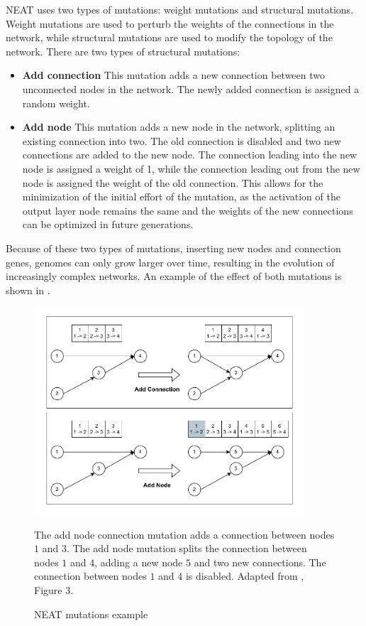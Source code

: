 NEAT uses two types of mutations: weight mutations and structural mutations. Weight mutations are used to perturb the weights of the connections in the network, while
structural mutations are used to modify the topology of the network. There are two types of structural mutations:

\begin{itemize}
    \item \textbf{Add connection} This mutation adds a new connection between two unconnected nodes in the network. The newly added connection is assigned a random weight.
    \item \textbf{Add node} This mutation adds a new node in the network, splitting an existing connection into two. The old connection is disabled and two new
        connections are added to the new node. The connection leading into the new node is assigned a weight of 1, while the connection leading out from the new node is
        assigned the weight of the old connection. This allows for the minimization of the initial effort of the mutation, as the activation of the output layer
        node remains the same and the weights of the new connections can be optimized in future generations.
\end{itemize}

Because of these two types of mutations, inserting new nodes and connection genes, genomes can only grow larger over time, resulting in the evolution of increasingly
complex networks. An example of the effect of both mutations is shown in .

\begin{figure}
    \centering
    \includegraphics[width=0.9\textwidth]{Pictures/neat_mutations}
    \caption{NEAT mutations example}{The add node connection mutation adds a connection between nodes $1$ and $3$.
    The add node mutation splits the connection between nodes $1$ and $4$, adding a new node $5$ and two new connections. The connection between nodes $1$ and $4$ is disabled.
    Adapted from \cite{neat}, Figure 3.}
    \label{fig:neat_mutations}
\end{figure}

